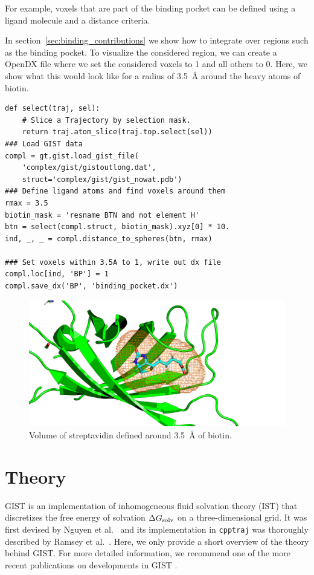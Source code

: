 \documentclass[9pt,tutorial]{livecoms}
\newcommand{\dgsolv}{\Delta G_\textup{solv}}
\newcommand{\software}{\texttt}
\begin{document}
For example, voxels that are part of the binding pocket can be defined using a ligand molecule and a distance criteria. 

In section~\ref{sec:binding_contributions} we show how to integrate over regions such as the binding pocket. To visualize the considered region, we can create a OpenDX file where we set the considered voxels to 1 and all others to 0. Here, we show what this would look like for a radius of \SI{3.5}{\angstrom} around the heavy atoms of biotin. 

\begin{lstlisting}[style=python]
def select(traj, sel):
	# Slice a Trajectory by selection mask.
	return traj.atom_slice(traj.top.select(sel))
### Load GIST data
compl = gt.gist.load_gist_file(
	'complex/gist/gistoutlong.dat', 
	struct='complex/gist/gist_nowat.pdb')
### Define ligand atoms and find voxels around them
rmax = 3.5
biotin_mask = 'resname BTN and not element H'
btn = select(compl.struct, biotin_mask).xyz[0] * 10.
ind, _, _ = compl.distance_to_spheres(btn, rmax)

### Set voxels within 3.5A to 1, write out dx file
compl.loc[ind, 'BP'] = 1
compl.save_dx('BP', 'binding_pocket.dx')
\end{lstlisting}

\begin{figure}
	\centering
	\includegraphics[width=1.0\linewidth]{streptavidin_bp_close.png}
	\caption{Volume of streptavidin defined around \SI{3.5}{\angstrom} of biotin. }\label{streptavidin_volume}
\end{figure}

\section{Theory}
\label{sec:theory}
GIST is an implementation of inhomogeneous fluid solvation theory (IST) \cite{Lazaridis1998} that discretizes the free energy of solvation $\dgsolv$ on a three-dimensional grid. 
It was first devised by Nguyen et al.\ \cite{Nguyen2012} and its implementation in \software{cpptraj} was thoroughly described by Ramsey et al.\ \cite{Ramsey2016}.
Here, we only provide a short overview of the theory behind GIST.
For more detailed information, we recommend one of the more recent publications on developments in GIST \cite{Kraml2020,Chen2021}.
\end{document}
